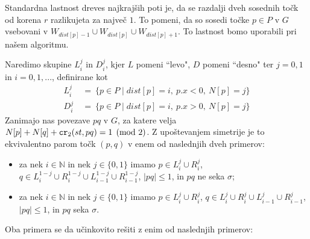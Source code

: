 \documentclass[a4paper, 12pt]{book}
\newcommand{\NN}{\ensuremath{\mathbb N}}  %
\def\dist{\mathit{dist}}
\newcommand\CR{\mbox{\tt cr}_2}		  %
\begin{document}
Standardna lastnost dreves najkrajših poti je, da se razdalji dveh sosednih točk od korena $r$ razlikujeta za največ $1$. To pomeni, da so sosedi točke $p\in P$ v $G$ vsebovani v $W_{\dist[p]-1}\cup W_{\dist[p]} \cup W_{\dist[p]+1}$. To lastnost bomo uporabili pri našem algoritmu.

Naredimo skupine $L_i^j$ in $D_i^j$, kjer $L$ pomeni ``levo", $D$ pomeni ``desno" ter $j=0,1$ in $i=0,1,...$, definirane kot
\begin{align*}
	L_i^j ~&=~ \{ p\in P \mid \dist[p]=i,~ p.x<0,~ N[p]=j \} \\
	D_i^j ~&=~ \{ p\in P \mid \dist[p]=i,~ p.x>0,~ N[p]=j \}
\end{align*}
Zanimajo nas povezave $pq$ v $G$, za katere velja $N[p]+N[q]+\CR(st,pq)=1 \pmod 2$. Z upoštevanjem simetrije je to ekvivalentno parom točk $(p, q)$ v enem od naslednjih dveh primerov:
\begin{itemize}
	\item za nek $i\in \NN$ in nek $j\in \{0,1\}$ imamo
			$p\in L_i^j\cup R_i^j$, 
			$q\in L_i^{1-j}\cup R_i^{1-j}\cup L_{i-1}^{1-j}\cup R_{i-1}^{1-j}$, 
			$|pq|\le 1$, in $pq$ ne seka $\sigma$;
	\item za nek $i\in \NN$ in nek $j\in \{0,1\}$ imamo
			$p\in L_i^j\cup R_i^j$, 
			$q\in L_i^{j}\cup R_i^{j}\cup L_{i-1}^{j}\cup R_{i-1}^{j}$, 
			$|pq|\le 1$, in $pq$ seka $\sigma$.
\end{itemize}
Oba primera se da učinkovito rešiti z enim od naslednjih primerov:
\end{document}
